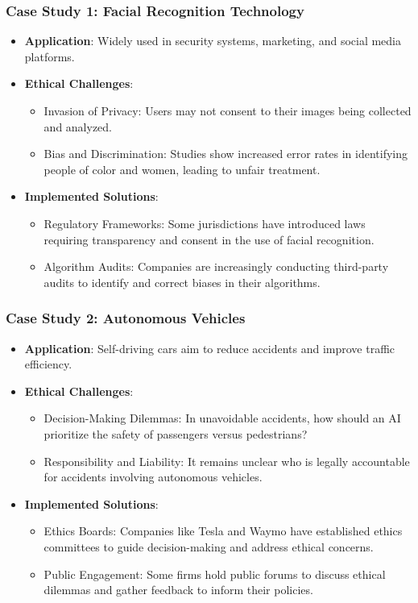 \documentclass[aspectratio=169]{beamer}
\begin{document}
\begin{frame}[fragile]
    \frametitle{Case Study 1: Facial Recognition Technology}
    \begin{itemize}
        \item \textbf{Application}: Widely used in security systems, marketing, and social media platforms.
        \item \textbf{Ethical Challenges}:
            \begin{itemize}
                \item Invasion of Privacy: Users may not consent to their images being collected and analyzed.
                \item Bias and Discrimination: Studies show increased error rates in identifying people of color and women, leading to unfair treatment.
            \end{itemize}
        \item \textbf{Implemented Solutions}:
            \begin{itemize}
                \item Regulatory Frameworks: Some jurisdictions have introduced laws requiring transparency and consent in the use of facial recognition.
                \item Algorithm Audits: Companies are increasingly conducting third-party audits to identify and correct biases in their algorithms.
            \end{itemize}
    \end{itemize}
\end{frame}

\begin{frame}[fragile]
    \frametitle{Case Study 2: Autonomous Vehicles}
    \begin{itemize}
        \item \textbf{Application}: Self-driving cars aim to reduce accidents and improve traffic efficiency.
        \item \textbf{Ethical Challenges}:
            \begin{itemize}
                \item Decision-Making Dilemmas: In unavoidable accidents, how should an AI prioritize the safety of passengers versus pedestrians?
                \item Responsibility and Liability: It remains unclear who is legally accountable for accidents involving autonomous vehicles.
            \end{itemize}
        \item \textbf{Implemented Solutions}:
            \begin{itemize}
                \item Ethics Boards: Companies like Tesla and Waymo have established ethics committees to guide decision-making and address ethical concerns.
                \item Public Engagement: Some firms hold public forums to discuss ethical dilemmas and gather feedback to inform their policies.
            \end{itemize}
    \end{itemize}
\end{frame}
\end{document}
